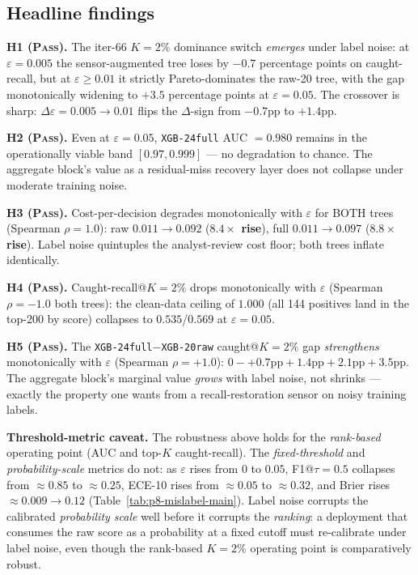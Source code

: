 \documentclass{article}
\begin{document}
\subsection{Headline findings}

\textbf{H1 (\textsc{Pass}).} The iter-66 $K{=}2\%$ dominance switch
\emph{emerges} under label noise: at $\varepsilon{=}0.005$ the
sensor-augmented tree loses by $-0.7$ percentage points on
caught-recall, but at $\varepsilon{\geq}0.01$ it strictly Pareto-dominates
the raw-20 tree, with the gap monotonically widening to $+3.5$ percentage
points at $\varepsilon{=}0.05$. The crossover is sharp:
$\Delta\varepsilon{=}0.005 \to 0.01$ flips the $\Delta$-sign from
$-0.7$pp to $+1.4$pp.

\textbf{H2 (\textsc{Pass}).} Even at $\varepsilon{=}0.05$,
\texttt{XGB-24full} AUC $= 0.980$ remains in the operationally viable
band $[0.97, 0.999]$ — no degradation to chance. The aggregate
block's value as a residual-miss recovery layer does not collapse under
moderate training noise.

\textbf{H3 (\textsc{Pass}).} Cost-per-decision degrades monotonically
with $\varepsilon$ for BOTH trees (Spearman $\rho{=}1.0$): raw
$0.011 \to 0.092$ (\textbf{$8.4\times$ rise}), full
$0.011 \to 0.097$ (\textbf{$8.8\times$ rise}). Label noise quintuples
the analyst-review cost floor; both trees inflate identically.

\textbf{H4 (\textsc{Pass}).} Caught-recall@$K{=}2\%$ drops
monotonically with $\varepsilon$ (Spearman $\rho{=}{-}1.0$ both
trees): the clean-data ceiling of $1.000$ (all 144 positives land in
the top-200 by score) collapses to $0.535$/$0.569$ at $\varepsilon{=}0.05$.

\textbf{H5 (\textsc{Pass}).} The \texttt{XGB-24full}$-$\texttt{XGB-20raw}
caught@$K{=}2\%$ gap \emph{strengthens} monotonically with $\varepsilon$
(Spearman $\rho{=}{+}1.0$): $0{-} + 0.7\text{pp} + 1.4\text{pp} + 2.1\text{pp} + 3.5\text{pp}$.
The aggregate block's marginal value \emph{grows} with label noise,
not shrinks — exactly the property one wants from a recall-restoration
sensor on noisy training labels.

\textbf{Threshold-metric caveat.} The robustness above holds for the
\emph{rank-based} operating point (AUC and top-$K$ caught-recall). The
\emph{fixed-threshold} and \emph{probability-scale} metrics do not: as
$\varepsilon$ rises from $0$ to $0.05$, F1@$\tau{=}0.5$ collapses from
$\approx 0.85$ to $\approx 0.25$, ECE-10 rises from $\approx 0.05$ to
$\approx 0.32$, and Brier rises $\approx 0.009 \to 0.12$
(Table~\ref{tab:p8-mislabel-main}). Label noise corrupts the calibrated
\emph{probability scale} well before it corrupts the \emph{ranking}: a
deployment that consumes the raw score as a probability at a fixed cutoff
must re-calibrate under label noise, even though the rank-based
$K{=}2\%$ operating point is comparatively robust.
\end{document}
